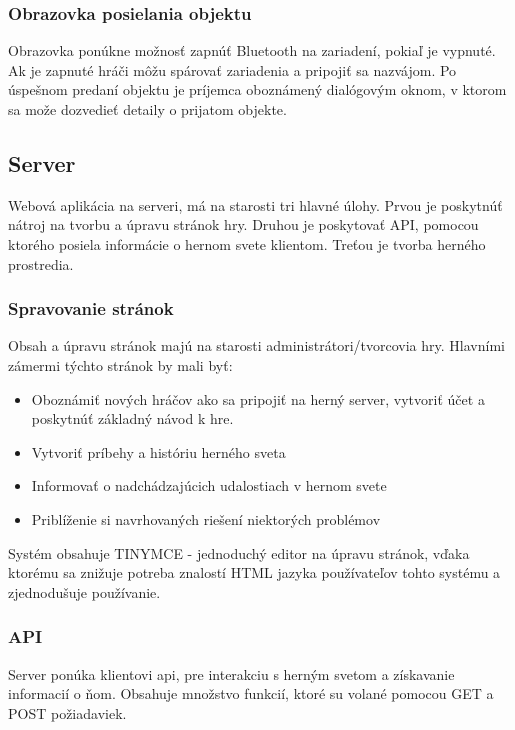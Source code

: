 \subsubsection{Obrazovka posielania objektu}
Obrazovka ponúkne možnosť zapnúť Bluetooth na zariadení, pokiaľ je vypnuté. Ak je zapnuté hráči môžu spárovať zariadenia a pripojiť sa nazvájom. Po úspešnom predaní objektu je príjemca oboznámený dialógovým oknom, v ktorom sa može dozvedieť detaily o prijatom objekte.


\subsection{Server}
Webová aplikácia na serveri, má na starosti tri hlavné úlohy. Prvou je poskytnúť nátroj na tvorbu a úpravu stránok hry. Druhou je poskytovať API, pomocou ktorého posiela informácie o hernom svete klientom. Treťou je tvorba herného prostredia.\ 

\subsubsection{Spravovanie stránok}
Obsah a úpravu stránok majú na starosti administrátori/tvorcovia hry. Hlavními zámermi týchto stránok by mali byť:
 \begin{itemize}
  \item Oboznámiť nových hráčov ako sa pripojiť na herný server, vytvoriť účet a poskytnúť základný návod k hre.
  \item Vytvoriť príbehy a históriu herného sveta 
  \item Informovať o nadchádzajúcich udalostiach v hernom svete
  \item Priblíženie si navrhovaných riešení niektorých problémov
\end{itemize}
Systém obsahuje TINYMCE - jednoduchý editor na úpravu stránok, vďaka ktorému sa znižuje potreba znalostí HTML jazyka používateľov tohto systému a zjednodušuje používanie.

\subsubsection{API}
Server ponúka klientovi api, pre interakciu s herným svetom a získavanie informacií o ňom. Obsahuje množstvo funkcií, ktoré su volané pomocou GET a POST požiadaviek.

